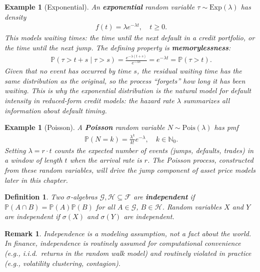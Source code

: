 \documentclass{report}
\theoremstyle{spacedplain}
\theoremstyle{spaceddefinition}
\newtheorem{definition}[theorem]{Definition}
\newtheorem{example}[theorem]{Example}
\theoremstyle{spacedremark}
\newtheorem{remark}[theorem]{Remark}
\begin{document}
\begin{example}[Exponential]
An \textbf{exponential} random variable $\tau \sim \text{Exp}(\lambda)$ has density
\begin{align}
    f(t) = \lambda e^{-\lambda t}, \quad t \geq 0.
\end{align}
This models waiting times: the time until the next default in a credit portfolio, or the time until the next jump. The defining property is \textbf{memorylessness}:
\begin{align}
    \mathbb{P}(\tau > t + s \mid \tau > s) = \frac{e^{-\lambda(t+s)}}{e^{-\lambda s}} = e^{-\lambda t} = \mathbb{P}(\tau > t).
\end{align}
Given that no event has occurred by time $s$, the residual waiting time has the same distribution as the original, so the process ``forgets'' how long it has been waiting. This is why the exponential distribution is the natural model for default intensity in reduced-form credit models: the hazard rate $\lambda$ summarizes all information about default timing.
\end{example}

\begin{example}[Poisson]
A \textbf{Poisson} random variable $N \sim \text{Pois}(\lambda)$ has pmf
\begin{align}
    \mathbb{P}(N = k) = \frac{\lambda^k}{k!}e^{-\lambda}, \quad k \in \mathbb{N}_0.
\end{align}
Setting $\lambda = r \cdot t$ counts the expected number of events (jumps, defaults, trades) in a window of length $t$ when the arrival rate is $r$. The Poisson process, constructed from these random variables, will drive the jump component of asset price models later in this chapter.
\end{example}

\begin{definition}
Two $\sigma$-algebras $\mathcal{G}, \mathcal{H} \subseteq \mathcal{F}$ are \textbf{independent} if $\mathbb{P}(A \cap B) = \mathbb{P}(A)\mathbb{P}(B)$ for all $A \in \mathcal{G}$, $B \in \mathcal{H}$. Random variables $X$ and $Y$ are independent if $\sigma(X)$ and $\sigma(Y)$ are independent.
\end{definition}

\begin{remark}
Independence is a modeling assumption, not a fact about the world. In finance, independence is routinely assumed for computational convenience (e.g., i.i.d.\ returns in the random walk model) and routinely violated in practice (e.g., volatility clustering, contagion).
\end{remark}
\end{document}
